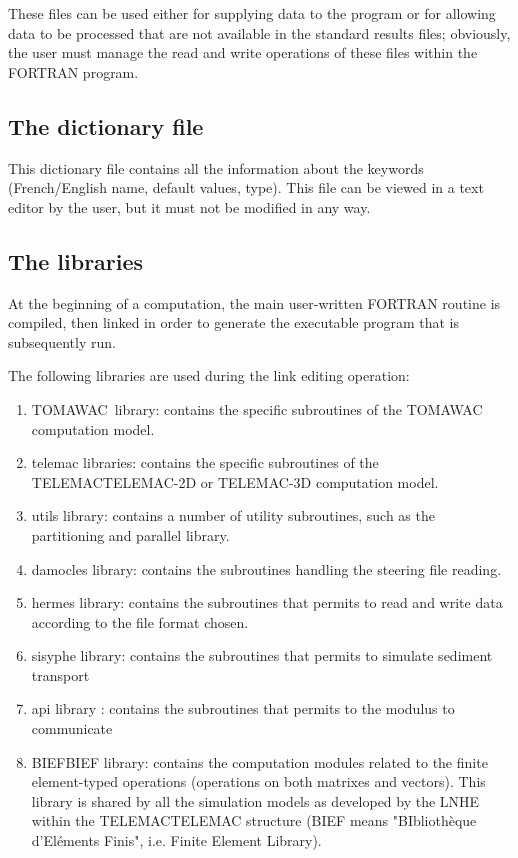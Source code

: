  These files can be used either for supplying data to the program or for allowing data to be processed that are not available in the standard results files; obviously, the user must manage the read and write operations of these files within the FORTRAN program.


\subsection{ The dictionary file}

 This dictionary file contains all the information about the keywords (French/English name, default values, type). This file can be viewed in a text editor by the user, but it must not be modified in any way.


\subsection{ The libraries}

 At the beginning of a computation, the main user-written FORTRAN routine is compiled, then linked in order to generate the executable program that is subsequently run.

 The following libraries are used during the link editing operation:

\begin{enumerate}
\item  TOMAWAC~library: contains the specific subroutines of the TOMAWAC computation model.

\item  telemac libraries: contains the specific subroutines of the TELEMACTELEMAC-2D or TELEMAC-3D computation model.

\item  utils library: contains a number of utility subroutines, such as the partitioning and parallel library.

\item  damocles library: contains the subroutines handling the steering file reading.

\item  hermes library: contains the subroutines that permits to read and write data according to the file format chosen.

\item  sisyphe library: contains the subroutines that permits to simulate sediment transport

\item  api library : contains the subroutines that permits to the modulus to communicate

\item  BIEFBIEF library: contains the computation modules related to the finite element-typed operations (operations on both matrixes and vectors). This library is shared by all the simulation models as developed by the LNHE within the TELEMACTELEMAC structure (BIEF means "BIbliothèque d'Eléments Finis", i.e. Finite Element Library).
\end{enumerate}


